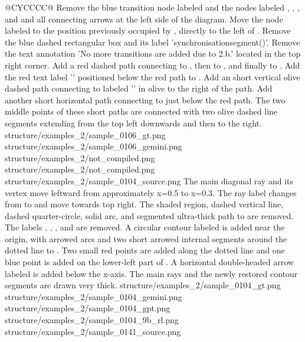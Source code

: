 \begin{table}[t]
\begin{tabularx}{\textwidth}{@{}CYCCCC@{}}
    {Remove the blue transition node labeled  and the nodes labeled , , , and  and all connecting arrows at the left side of the diagram. Move the node labeled  to the position previously occupied by , directly to the left of . Remove the blue dashed rectangular box and its label 'synchronisationsegment()'. Remove the text annotation 'No more transitions are added due to 2.b.' located in the top right corner. Add a red dashed path connecting  to , then to , and finally to . Add the red text label '' positioned below the red path to . Add an short vertical olive dashed path connecting  to  labeled '' in olive to the right of the path. Add another short horizontal path connecting  to  just below the red path. The two middle points of these short paths are connected with two olive dashed line segments extending from the top left downwards and then to the right.}
    {structure/examples_2/sample_0106_gt.png}
    {structure/examples_2/sample_0106_gemini.png}
    {structure/examples_2/not_compiled.png}
    {structure/examples_2/not_compiled.png}
    \midrule
    \exrowtwothree
    {structure/examples_2/sample_0104_source.png}
    {The main diagonal ray and its vertex move leftward from approximately x=0.5 to x=0.3. The ray label changes from  to  and move towards top right. The shaded region, dashed vertical line, dashed quarter-circle, solid arc, and segmented ultra-thick path to  are removed. The labels , , , and  are removed. A circular contour labeled  is added near the origin, with arrowed arcs and two short arrowed internal segments around the dotted line to . Two small red points are added along the dotted line and one blue point is added on the lower-left part of . A horizontal double-headed arrow labeled  is added below the x-axis. The main rays and the newly restored contour segments are drawn very thick.}
    {structure/examples_2/sample_0104_gt.png}
    {structure/examples_2/sample_0104_gemini.png}
    {structure/examples_2/sample_0104_gpt.png}
    {structure/examples_2/sample_0104_9b_rl.png}
    \midrule
    \exrowtwofour
    {structure/examples_2/sample_0141_source.png}

\end{tabularx}
\end{table}
